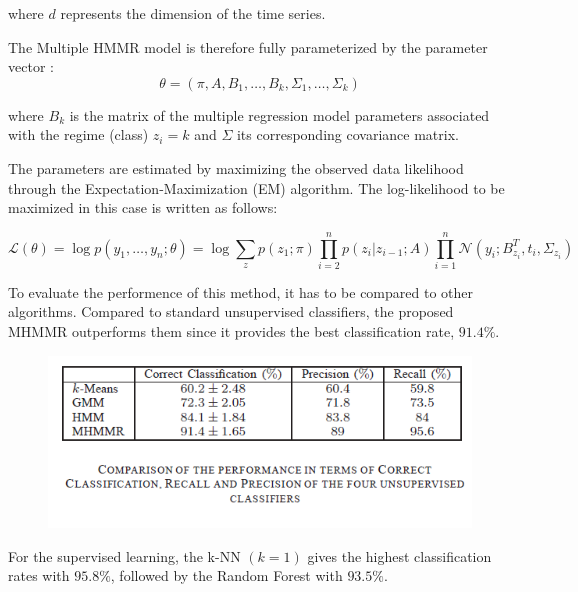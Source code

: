 \documentclass[11pt,a4paper,oneside]{article}
\begin{document}
where $d$ represents the dimension of the time series.

The Multiple HMMR model is therefore fully parameterized by the parameter vector :
\begin{equation}
\theta = (\pi,A,B_1, \ldots,B_k, \Sigma_1, \ldots ,\Sigma_k)
\end{equation}

where $B_k$ is the matrix of the multiple regression model parameters associated with the regime (class) $z_i = k$ and $\Sigma$ its corresponding covariance matrix. 

The parameters are estimated by maximizing the observed data likelihood through the Expectation-Maximization (EM) algorithm. The log-likelihood to be maximized in this case is written as follows: 

\begin{equation}
\mathcal{L}(\theta) = \log p(y_1, \ldots, y_n; \theta) = \log \sum_z p(z_1;\pi) \prod_{i=2}^n p(z_i|z_{i-1};A) \prod_{i=1}^n \mathcal{N}(y_i; B_{z_i}^T, t_i, \Sigma_{z_i})
\end{equation}


To evaluate the performence of this method, it has to be compared to other algorithms. Compared to standard unsupervised classifiers, the proposed MHMMR outperforms them since it provides the best classification rate, $91.4\%$. 

\begin{figure} [h!]
	\begin{center}
		\includegraphics[scale=0.8]{4.png}
	\end{center}
\end{figure}

For the supervised learning, the k-NN $(k = 1)$ gives the highest classification rates with $95.8\%$, followed by the Random Forest with $93.5\%$.
\end{document}
